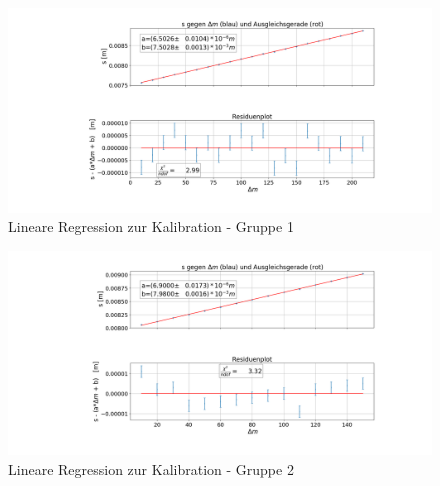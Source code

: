 \documentclass[a4paper, 11pt]{article}
\begin{document}
\begin{figure}[H]
	\hskip-4cm
	\includegraphics[scale=0.45]{./Bilder/Kalibration_1.png}
	\caption{Lineare Regression zur Kalibration - Gruppe 1}
	\label{pic:Kalibration_1}	
\end{figure}

\begin{figure}[H]
	\hskip-4cm
	\includegraphics[scale=0.45]{./Bilder/Kalibration_2.png}
	\caption{Lineare Regression zur Kalibration - Gruppe 2}
	\label{pic:Kalibration_2}	
\end{figure}
\end{document}
